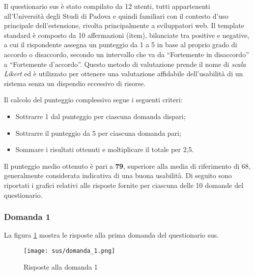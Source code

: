 \par Il questionario \gls{sus} è stato compilato da 12 utenti, tutti appartenenti all’Università degli Studi di Padova e quindi familiari con il contesto d’uso principale dell’estensione, rivolta principalmente a sviluppatori web. Il template standard è composto da 10 affermazioni (item), bilanciate tra positive e negative, a cui il rispondente assegna un punteggio da 1 a 5 in base al proprio grado di accordo o disaccordo, secondo un intervallo che va da “Fortemente in disaccordo” a “Fortemente d’accordo”. Questo metodo di valutazione prende il nome di \textit{scala Likert} ed è utilizzato per ottenere una valutazione affidabile dell’usabilità di un sistema senza un dispendio eccessivo di risorse.

\vspace{10pt}
\par\noindent Il calcolo del punteggio complessivo segue i seguenti criteri:
\begin{itemize}
  \item Sottrarre 1 dal punteggio per ciascuna domanda dispari;
  \item Sottrarre il punteggio da 5 per ciascuna domanda pari;
  \item Sommare i risultati ottenuti e moltiplicare il totale per 2,5. 
\end{itemize}

\vspace{5pt}
\par\noindent Il punteggio medio ottenuto è pari a \textbf{79}, superiore alla media di riferimento di 68, generalmente considerata indicativa di una buona usabilità. Di seguito sono riportati i grafici relativi alle risposte fornite per ciascuna delle 10 domande del questionario.

\subsubsection*{Domanda 1}

\vspace{5pt}
\begin{minipage}{\textwidth}
  \par\noindent La figura \ref{fig:sus_q1} mostra le risposte alla prima domanda del questionario \gls{sus}.
  \begin{figure}[H]
    \centering
    \texttt{[image: sus/domanda\_1.png]}
    \caption{Risposte alla domanda 1}
    \label{fig:sus_q1}
  \end{figure}
\end{minipage}

